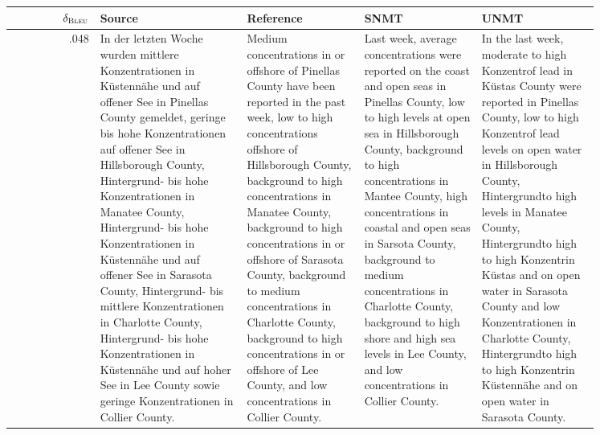 %

\begin{table}[ht]
\centering
\fontsize{7.8}{7.8}
\selectfont
\begin{tabular}{r @{\hspace{1mm}} p{0.25\linewidth}p{0.2\linewidth}p{0.2\linewidth}p{0.2\linewidth}}
 $\delta_{{\textsc{Bleu}}}$ & Source   & Reference& SNMT & UNMT  \\\hline\hline
.048  & In der letzten Woche wurden mittlere Konzentrationen in Küstennähe und auf offener See in Pinellas County gemeldet, geringe bis hohe Konzentrationen auf offener See in Hillsborough County, Hintergrund- bis hohe Konzentrationen in Manatee County, Hintergrund- bis hohe Konzentrationen in Küstennähe und auf offener See in Sarasota County, Hintergrund- bis mittlere Konzentrationen in Charlotte County, Hintergrund- bis hohe Konzentrationen in Küstennähe und auf hoher See in Lee County sowie geringe Konzentrationen in Collier County. & Medium concentrations in or offshore of Pinellas County have been reported in the past week, low to high concentrations offshore of Hillsborough County, background to high concentrations in Manatee County, background to high concentrations in or offshore of Sarasota County, background to medium concentrations in Charlotte County, background to high concentrations in or offshore of Lee County, and low concentrations in Collier County. & Last week, average concentrations were reported on the coast and open seas in Pinellas County, low to high levels at open sea in Hillsborough County, background to high concentrations in Mantee County, high concentrations in coastal and open seas in Sarsota County, background to medium concentrations in Charlotte County, background to high shore and high sea levels in Lee County, and low concentrations in Collier County. & In the last week, moderate to high Konzentrof lead in Küstas County were reported in Pinellas County, low to high Konzentrof lead levels on open water in Hillsborough County, Hintergrundto high levels in Manatee County, Hintergrundto high to high Konzentrin Küstas and on open water in Sarasota County and low Konzentrationen in Charlotte County, Hintergrundto high to high Konzentrin Küstennähe and on open water in Sarasota County. \\\hline

\end{tabular}
\end{table}
